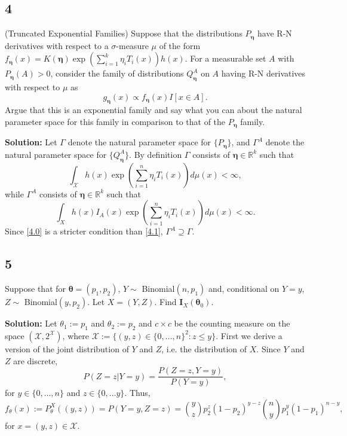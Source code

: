 \documentclass[12pt]{article}
\newcounter{ProofCounter}
\begin{document}
\subsection*{4}
\begin{tcolorbox}
(Truncated Exponential Families) Suppose that the distributions $P_{\bm{\eta}}$ have R-N derivatives with respect to a
$\sigma$-measure $\mu$ of the form $f_{\bm{\eta}}(x) = K(\bm{\eta}) \exp \left(  \sum_{i=1}^k \eta_i T_i(x)\right) h(x)$.
For a measurable set $A$ with $P_{\bm{\eta}}(A)>0$, consider the family of distributions $Q_{\bm{\eta}}^A$ on $A$ having R-N derivatives
with respect to $\mu$ as
\[
  g_{\bm{\eta}}(x ) \propto f_{\bm{\eta}}(x) I[x\in A].
\]
Argue that this is an exponential family and say what you can about the natural parameter space for this family in comparison to that of the $P_{\bm{\eta}}$ family.
\end{tcolorbox}

\textbf{Solution:} Let $\Gamma$ denote the natural parameter space for $\{P_{\bm{\eta}}\}$, and $\Gamma^{A}$ denote the natural parameter space for
$\{Q_{\bm{\eta}}^{A}\}$. By definition $\Gamma$ consists of $\bm{\eta} \in \mathbb{R}^{k}$ such that 
\begin{equation}
  \int_{\mathcal{X}} h(x)\exp\left( \sum_{i=1}^{n}\eta_{i}T_i(x) \right)d\mu(x) < \infty,
  \label{4.0}
\end{equation}
while $\Gamma^{A}$ consists of $\bm{\eta} \in \mathbb{R}^{k}$ such that
\begin{equation}
  \int_{X} h(x)I_A(x)\exp\left( \sum_{i=1}^{n}\eta_{i}T_i(x) \right) d\mu(x) < \infty.
  \label{4.1}
\end{equation}
Since \eqref{4.0} is a stricter condition than \eqref{4.1}, $\Gamma^{A} \supseteq \Gamma$.



\newpage

\subsection*{5}
\begin{tcolorbox}
  Suppose that for $\bm{\theta}=(p_1,p_2)$, $Y\sim$ Binomial$(n,p_1)$ and, conditional on $Y=y$, $Z\sim$ Binomial$(y,p_2)$. Let $X=(Y,Z)$.  Find $\bm{I}_{X}(\bm{\theta}_0)$.
\end{tcolorbox}

\textbf{Solution:} Let $\theta_1 := p_1$ and $\theta_2 := p_2$ and $c\times c$ be the counting measure on the space $(\mathcal{X}, 2^{\mathcal{X}})$,
where
$\mathcal{X} := \{(y,z) \in \{0,\hdots, n\}^{2} : z \leq y\}$. 
First we derive a version of the joint distribution of $Y$ and $Z$, i.e. the
distribution of $X$. Since $Y$ and $Z$ are discrete,
\[
  P(Z = z | Y = y) = \frac{P(Z = z, Y = y)}{P(Y=y)},
\]
for $y \in \{0,\hdots, n\}$ and $z \in \{0, \hdots y\}$. Thus,
\begin{equation}
  f_{\theta}(x) := P_{\theta}^{X}\left( (y,z) \right) = P(Y = y, Z = z) = \binom{y}{z}p_{2}^{z}(1 -
  p_2)^{y-z}\binom{n}{y}p_{1}^{y}(1-p_1)^{n-y},
  \label{5.1}
\end{equation}
for $x = (y,z) \in \mathcal{X}$. 
\end{document}
